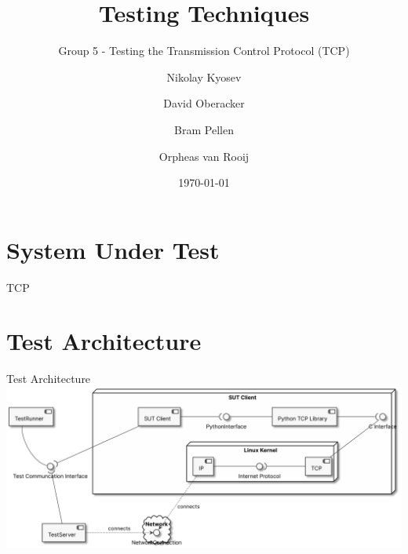 \documentclass[showdate=true, slidenumbers=slide]{beamerruhuisstijl169}
\title{Testing Techniques}
\subtitle{Group 5 - Testing the Transmission Control Protocol (TCP)}
\date{\today}
\author{Nikolay Kyosev \and David Oberacker \and Bram Pellen \and Orpheas van Rooij}
\begin{document}
\begin{frame}
    \maketitle
\end{frame}

\begin{frame}
    \tableofcontents
\end{frame}

\section{System Under Test}

\begin{frame}{TCP}

\end{frame}

\section{Test Architecture}

\begin{frame}{Test Architecture}
    \centering
    \includegraphics[width=\textwidth]{figures/SUTArchitecture.pdf}
\end{frame}
\end{document}
